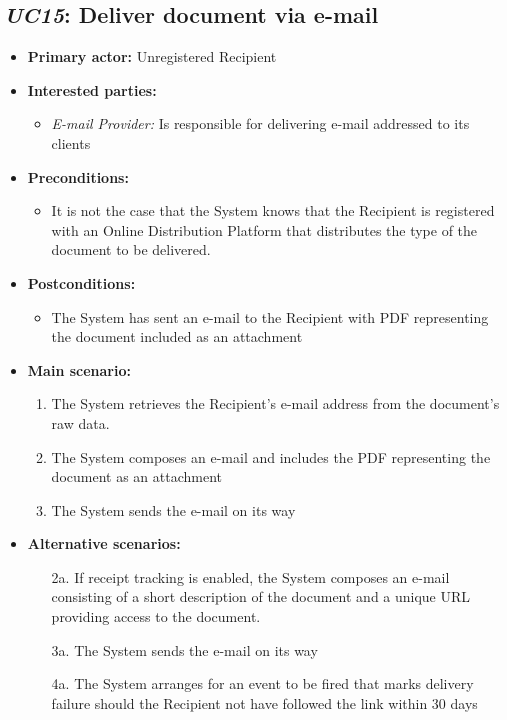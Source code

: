 \documentclass[a4paper,10pt]{article}
\begin{document}
\subsection{\emph{UC15}: Deliver document via e-mail}
\begin{itemize}
    \item \textbf{Primary actor:} Unregistered Recipient
    \item \textbf{Interested parties:} 
        \begin{itemize}
            \item \textit{E-mail Provider:} Is responsible for delivering e-mail addressed to its clients
        \end{itemize}

    \item \textbf{Preconditions:}
        \begin{itemize}
            \item It is not the case that the System knows that the Recipient is registered with an Online Distribution Platform that distributes the type of the document to be delivered.
        \end{itemize}

    \item \textbf{Postconditions:}
        \begin{itemize}
            \item The System has sent an e-mail to the Recipient with PDF representing the document included as an attachment
        \end{itemize}
        
    \item \textbf{Main scenario:} 
    \begin{enumerate}
       \item The System retrieves the Recipient's e-mail address from the document's raw data.
       \item The System composes an e-mail and includes the PDF representing the document as an attachment
       \item The System sends the e-mail on its way
    \end{enumerate}

    \item \textbf{Alternative scenarios:} 
    \begin{enumerate}
        \item [2a.] If receipt tracking is enabled, the System composes an e-mail consisting of a short description of the document and a unique URL providing access to the document.
        \item [3a.] The System sends the e-mail on its way
        \item [4a.] The System arranges for an event to be fired that marks delivery failure should the Recipient not have followed the link within 30 days
    \end{enumerate}
    

\end{itemize}
\end{document}
